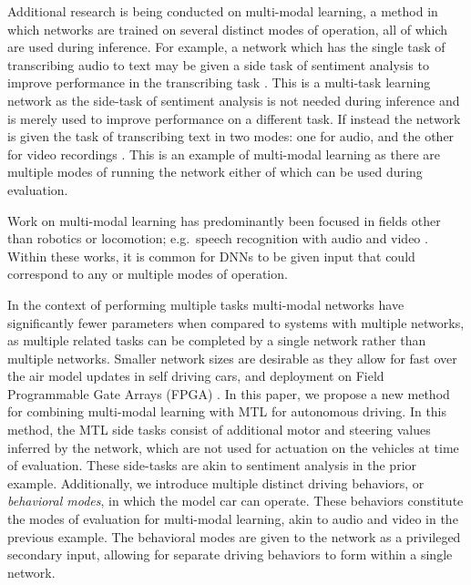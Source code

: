 Additional research is being conducted on multi-modal learning, a method in which networks are trained on several distinct modes of operation, all of which are used during inference.
For example, a network which has the single task of transcribing audio to text may be given a side task of sentiment analysis to improve performance in the transcribing task \cite{6639012}. This is a multi-task learning network as the side-task of sentiment analysis is not needed during inference and is merely used to improve performance on a different task. If instead the network is given the task of transcribing text in two modes: one for audio, and the other for video recordings \cite{ngiam2011multimodal}. This is an example of multi-modal learning as there are multiple modes of running the network either of which can be used during evaluation.

Work on multi-modal learning has predominantly been focused in fields other than robotics or locomotion; e.g.\ speech recognition with audio and video \cite{ngiam2011multimodal, 6639012}. Within these works, it is common for DNNs to be given input that could correspond to any or multiple modes of operation. 

In the context of performing multiple tasks multi-modal networks have significantly fewer parameters when compared to systems with multiple networks, as multiple related tasks can be completed by a single network rather than multiple networks. Smaller network sizes are desirable as they allow for fast over the air model updates in self driving cars, and deployment on Field Programmable Gate Arrays (FPGA) \cite{DBLP:journals/corr/IandolaMAHDK16}.
In this paper, we propose a new method for combining multi-modal learning with MTL for autonomous driving.
In this method, the MTL side tasks consist of additional motor and steering values inferred by the network, which are not used for actuation on the vehicles at time of evaluation. These side-tasks are akin to sentiment analysis in the prior example.
Additionally, we introduce multiple distinct driving behaviors, or \textit{behavioral modes}, in which the model car can operate.
These behaviors constitute the modes of evaluation for multi-modal learning, akin to audio and video in the previous example.
The behavioral modes are given to the network as a privileged secondary input, allowing for separate driving behaviors to form within a single network.

